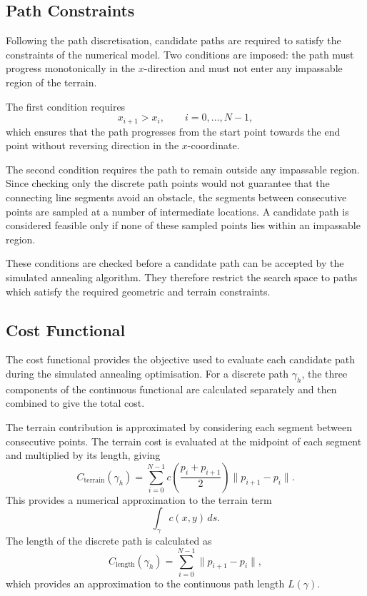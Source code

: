 \subsection{Path Constraints}
\label{subsec:path_constraints}

Following the path discretisation, candidate paths are required to satisfy the constraints of the numerical model. Two
conditions are imposed: the path must progress monotonically in the
$x$-direction and must not enter any impassable region of the terrain.

The first condition requires
\begin{equation}
x_{i+1}>x_i,
\qquad i=0,\ldots,N-1,
\label{eq:x_order_constraint}
\end{equation}
which ensures that the path progresses from the start point towards the
end point without reversing direction in the $x$-coordinate.

The second condition requires the path to remain outside any
impassable region. Since checking only the discrete path points would
not guarantee that the connecting line segments avoid an obstacle, the
segments between consecutive points are sampled at a number of
intermediate locations. A candidate path is considered feasible only
if none of these sampled points lies within an impassable region.

These conditions are checked before a candidate path can be accepted by
the simulated annealing algorithm. They therefore restrict the search
space to paths which satisfy the required geometric and terrain
constraints.

\subsection{Cost Functional}
\label{subsec:cost_functional}

The cost functional provides the objective used to evaluate each
candidate path during the simulated annealing optimisation. For a
discrete path $\gamma_h$, the three components of the continuous
functional are calculated separately and then combined to give the
total cost.

The terrain contribution is approximated by considering each segment
between consecutive points. The terrain cost is evaluated at the
midpoint of each segment and multiplied by its length, giving
\begin{equation}
C_{\mathrm{terrain}}(\gamma_h)
=
\sum_{i=0}^{N-1}
c\left(\frac{p_i+p_{i+1}}{2}\right)
\|p_{i+1}-p_i\|.
\label{eq:discrete_terrain_cost}
\end{equation}
This provides a numerical approximation to the terrain term
\[
\int_\gamma c(x,y)\,ds.
\]
The length of the discrete path is calculated as
\begin{equation}
C_{\mathrm{length}}(\gamma_h)
=
\sum_{i=0}^{N-1}
\|p_{i+1}-p_i\|,
\label{eq:discrete_path_length}
\end{equation}
which provides an approximation to the continuous path length
$L(\gamma)$.

